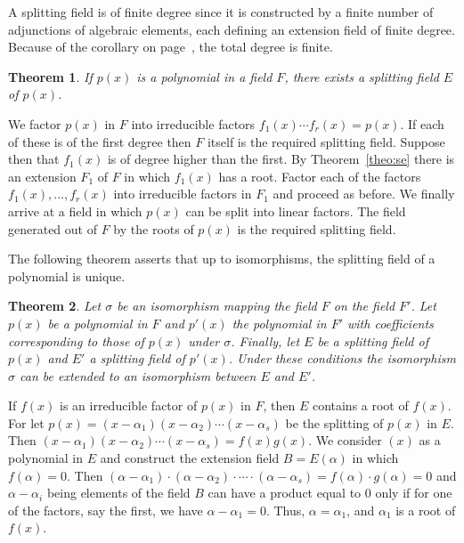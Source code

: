 \documentclass[10pt,leqno,a5paper]{book}
\newtheorem{theo}{Theorem}
\theoremstyle{definition}
\begin{document}
A splitting field is of finite degree since it is constructed by a finite number of adjunctions of algebraic elements, each defining an extension field of finite degree.
Because of the corollary on page~\pageref{coro:p22}, the total degree is finite.

\begin{theo}
\label{theo:ni}
If $p(x)$ is a polynomial in a field $F$, there exists a splitting field $E$ of $p(x)$.
\end{theo}

We factor $p(x)$ in $F$ into irreducible factors $f_1(x) \cdots f_r(x) = p(x)$.
If each of these is of the first degree then $F$ itself is the required splitting field.
Suppose then that $f_1(x)$ is of degree higher than the first.
By Theorem~\ref{theo:se} there is an extension $F_1$ of $F$ in which $f_1(x)$ has a root.
Factor each of the factors $f_1(x), \ldots, f_r(x)$ into irreducible factors in $F_1$ and proceed as before.
We finally arrive at a field in which $p(x)$ can be split into linear factors.
The field generated out of $F$ by the roots of $p(x)$ is the required splitting field.

The following theorem asserts that up to isomorphisms, the splitting field of a polynomial is unique.

\begin{theo}
\label{theo:onze}
Let $\sigma$ be an isomorphism mapping the field $F$ on the field $F'$.
Let $p(x)$ be a polynomial in $F$ and $p'(x)$ the polynomial in $F'$ with coefficients corresponding to those of $p(x)$ under $\sigma$.
Finally, let $E$ be a splitting field of $p(x)$ and $E'$ a splitting field of $p'(x)$.
Under these conditions the isomorphism $\sigma$ can be extended to an isomorphism between $E$ and $E'$.
\end{theo}

If $f(x)$ is an irreducible factor of $p(x)$ in $F$, then $E$ contains a root of $f(x)$.
For let $p(x) = (x - \alpha_1) (x - \alpha_2) \cdots (x - \alpha_s)$ be the splitting of $p(x)$ in $E$.
Then $(x - \alpha_1) (x - \alpha_2) \cdots (x - \alpha_s) = f(x) g(x)$.
We consider $(x)$ as a polynomial in $E$ and construct the extension field $B = E(\alpha)$ in which $f(\alpha) = 0$.
Then $(\alpha - \alpha_1) \cdot (\alpha - \alpha_2) \cdot \cdots \cdot (\alpha - \alpha_s) = f(\alpha) \cdot g(\alpha) = 0$ and $\alpha - \alpha_i$ being elements of the field $B$ can have a product equal to $0$ only if for one of the factors, say the first, we have $\alpha - \alpha_1 = 0$.
Thus, $\alpha = \alpha_1$, and $\alpha_1$ is a root of $f(x)$.
\end{document}
